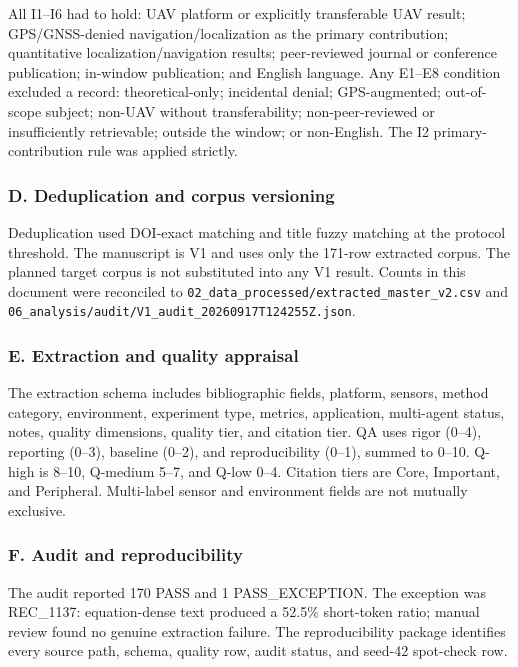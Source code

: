 \documentclass[
  journal,
  10pt]{IEEEtran}
\begin{document}
All I1--I6 had to hold: UAV platform or explicitly transferable UAV
result; GPS/GNSS-denied navigation/localization as the primary
contribution; quantitative localization/navigation results;
peer-reviewed journal or conference publication; in-window publication;
and English language. Any E1--E8 condition excluded a record:
theoretical-only; incidental denial; GPS-augmented; out-of-scope
subject; non-UAV without transferability; non-peer-reviewed or
insufficiently retrievable; outside the window; or non-English. The I2
primary-contribution rule was applied strictly.

\subsubsection{D. Deduplication and corpus
versioning}\label{d-deduplication-and-corpus-versioning}

Deduplication used DOI-exact matching and title fuzzy matching at the
protocol threshold. The manuscript is V1 and uses only the 171-row
extracted corpus. The planned target corpus is not substituted into any
V1 result. Counts in this document were reconciled to
\texttt{02\_data\_processed/extracted\_master\_v2.csv} and
\texttt{06\_analysis/audit/V1\_audit\_20260917T124255Z.json}.

\subsubsection{E. Extraction and quality
appraisal}\label{e-extraction-and-quality-appraisal}

The extraction schema includes bibliographic fields, platform, sensors,
method category, environment, experiment type, metrics, application,
multi-agent status, notes, quality dimensions, quality tier, and
citation tier. QA uses rigor (0--4), reporting (0--3), baseline (0--2),
and reproducibility (0--1), summed to 0--10. Q-high is 8--10, Q-medium
5--7, and Q-low 0--4. Citation tiers are Core, Important, and
Peripheral. Multi-label sensor and environment fields are not mutually
exclusive.

\subsubsection{F. Audit and
reproducibility}\label{f-audit-and-reproducibility}

The audit reported 170 PASS and 1 PASS\_EXCEPTION. The exception was
REC\_1137: equation-dense text produced a 52.5\% short-token ratio;
manual review found no genuine extraction failure. The reproducibility
package identifies every source path, schema, quality row, audit status,
and seed-42 spot-check row.
\end{document}
